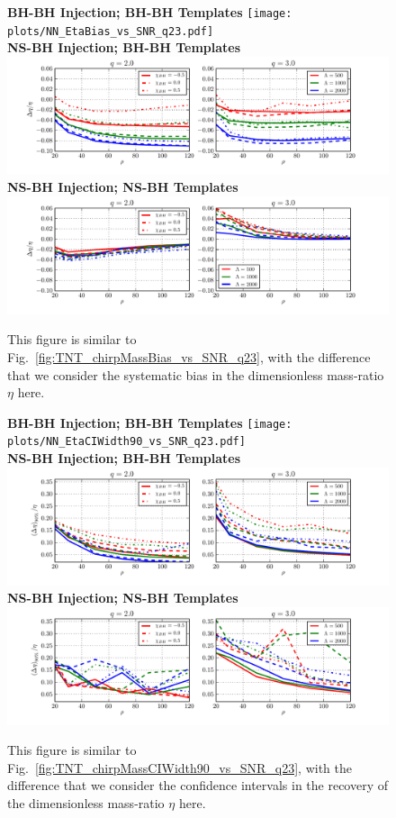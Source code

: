 \documentclass[aps,prd,amsmath,floats,floatfix, twocolumn,
superscriptaddress,nofootinbib,showpacs]{revtex4-1}
\begin{document}
\begin{figure}[h]
\centering    
\textbf{BH-BH Injection; BH-BH Templates}
\texttt{[image: plots/NN\_EtaBias\_vs\_SNR\_q23.pdf]}\\ 
\textbf{NS-BH Injection; BH-BH Templates}
\includegraphics[width=1.85\columnwidth]{plots/TN_EtaBias_vs_SNR_q23.pdf}\\ 
\textbf{NS-BH Injection; NS-BH Templates}
\includegraphics[width=1.85\columnwidth]{plots/TT_EtaBias_vs_SNR_q23.pdf}%
\caption{This figure is similar to Fig.~\ref{fig:TNT_chirpMassBias_vs_SNR_q23},
with the difference that we consider the systematic bias in the dimensionless
mass-ratio $\eta$ here.}
\label{fig:TNT_EtaBias_vs_SNR_q23}
\end{figure}
% 
\begin{figure}[h]
\centering    
\textbf{BH-BH Injection; BH-BH Templates}
\texttt{[image: plots/NN\_EtaCIWidth90\_vs\_SNR\_q23.pdf]}\\ 
\textbf{NS-BH Injection; BH-BH Templates}
\includegraphics[width=1.85\columnwidth]{plots/TN_EtaCIWidth90_vs_SNR_q23.pdf}\\ 
\textbf{NS-BH Injection; NS-BH Templates}
\includegraphics[width=1.85\columnwidth]{plots/TT_EtaCIWidth90_vs_SNR_q23.pdf}%
\caption{This figure is similar to Fig.~\ref{fig:TNT_chirpMassCIWidth90_vs_SNR_q23},
  with the difference that we consider the confidence intervals in the recovery
  of the dimensionless mass-ratio $\eta$ here.}
\label{fig:TNT_EtaCIWidth90_vs_SNR_q23}
\end{figure}
\end{document}
